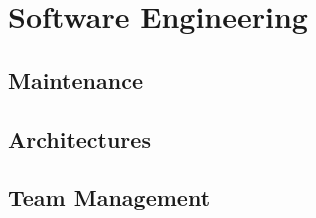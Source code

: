 \section{Software Engineering}\label{sec:software-engineering}



\subsection{Maintenance}\label{sec:software-engineering-maintenance}



\subsection{Architectures}\label{sec:software-engineering-architectures}



\subsection{Team Management}\label{sec:software-engineering-team-management}